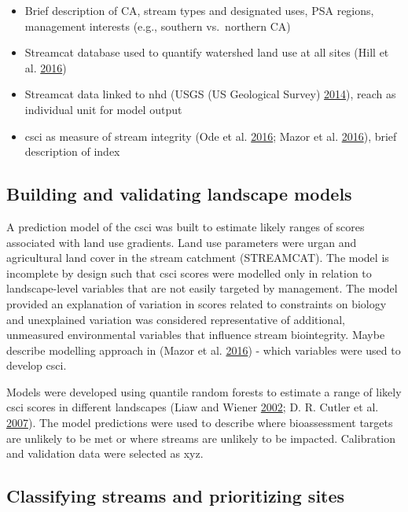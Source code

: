 \documentclass[]{article}
\begin{document}
\begin{itemize}
\item
  Brief description of CA, stream types and designated uses, PSA
  regions, management interests (e.g., southern vs.~northern CA)
\item
  Streamcat database used to quantify watershed land use at all sites
  (Hill et al. \protect\hyperlink{ref-Hill16}{2016})
\item
  Streamcat data linked to \ac{nhd} (USGS (US Geological Survey)
  \protect\hyperlink{ref-USGS14}{2014}), reach as individual unit for
  model output
\item
  \ac{csci} as measure of stream integrity (Ode et al.
  \protect\hyperlink{ref-Ode16}{2016}; Mazor et al.
  \protect\hyperlink{ref-Mazor16}{2016}), brief description of index
\end{itemize}

\subsection{Building and validating landscape
models}\label{building-and-validating-landscape-models}

A prediction model of the \ac{csci} was built to estimate likely ranges
of scores associated with land use gradients. Land use parameters were
urgan and agricultural land cover in the stream catchment (STREAMCAT).
The model is incomplete by design such that \ac{csci} scores were
modelled only in relation to landscape-level variables that are not
easily targeted by management. The model provided an explanation of
variation in scores related to constraints on biology and unexplained
variation was considered representative of additional, unmeasured
environmental variables that influence stream biointegrity. Maybe
describe modelling approach in (Mazor et al.
\protect\hyperlink{ref-Mazor16}{2016}) - which variables were used to
develop \ac{csci}.

Models were developed using quantile random forests to estimate a range
of likely \ac{csci} scores in different landscapes (Liaw and Wiener
\protect\hyperlink{ref-Liaw02}{2002}; D. R. Cutler et al.
\protect\hyperlink{ref-Cutler07}{2007}). The model predictions were used
to describe where bioassessment targets are unlikely to be met or where
streams are unlikely to be impacted. Calibration and validation data
were selected as xyz.

\subsection{Classifying streams and prioritizing
sites}\label{classifying-streams-and-prioritizing-sites}
\end{document}
